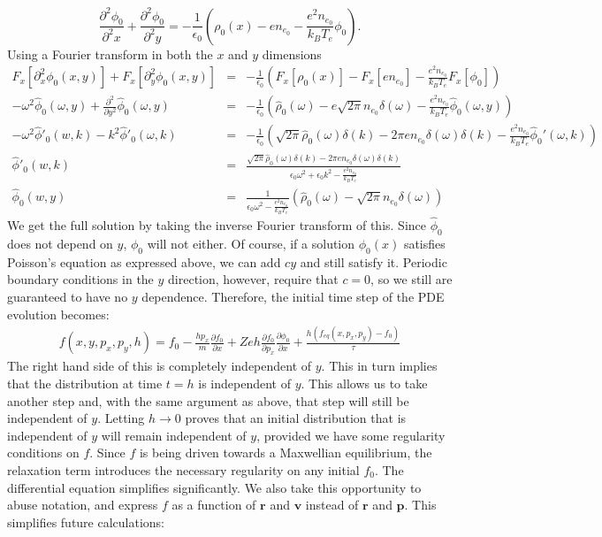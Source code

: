 \documentclass{article}
\begin{document}
\[\frac{\partial^2\phi_0}{\partial^2 x}+\frac{\partial^2\phi_0}{\partial^2 y}=-\frac{1}{\epsilon_0}\left(\rho_0(x)-en_{e_0}-\frac{e^2n_{e_0}}{k_BT_e}\phi_0\right).
\]Using a Fourier transform in both the $x$ and $y$ dimensions
\begin{eqnarray*}
F_x[\partial_x^2\phi_0(x,y)]+F_x[\partial_y^2\phi_0(x,y)]&=&-\frac{1}{\epsilon_0}\left(F_x[\rho_0(x)]-F_x[en_{e_0}]-\frac{e^2n_{e_0}}{k_BT_e}F_x[\phi_0]\right)\\
-\omega^2\hat{\phi}_0(\omega,y)+\frac{\partial^2}{\partial y^2}\hat{\phi}_0(\omega,y)&=&-\frac{1}{\epsilon_0}\left(\hat{\rho}_0(\omega)-e\sqrt{2\pi}n_{e_0}\delta(\omega)-\frac{e^2n_{e_0}}{k_BT_e}\hat{\phi}_0(\omega,y)\right)\\
-\omega^2\hat{\phi}'_0(w,k)-k^2\hat{\phi}'_0(\omega,k)&=&-\frac{1}{\epsilon_0}\left(\sqrt{2\pi}\hat{\rho}_0(\omega)\delta(k)-2\pi e n_{e_0}\delta(\omega)\delta(k)-\frac{e^2n_{e_0}}{k_BT_e}\hat{\phi}_0'(\omega,k)\right)\\
\hat{\phi}'_0(w,k)&=&\frac{\sqrt{2\pi}\hat{\rho}_0(\omega)\delta(k)-2\pi en_{e_0}\delta(\omega)\delta(k)}{\epsilon_0\omega^2+\epsilon_0k^2-\frac{e^2n_{e_0}}{k_BT_e}}\\
\hat{\phi}_0(w,y)&=&\frac{1}{\epsilon_0\omega^2-\frac{e^2n_{e_0}}{k_BT_e}}\left(\hat{\rho}_0(\omega)-\sqrt{2\pi}n_{e_0}\delta(\omega)\right)
\end{eqnarray*}We get the full solution by taking the inverse Fourier transform of this. Since $\hat{\phi}_0$ does not depend on $y$, $\phi_0$ will not either. Of course, if a solution $\phi_0(x)$ satisfies Poisson's equation as expressed above, we can add $cy$ and still satisfy it. Periodic boundary conditions in the $y$ direction, however, require that $c=0$, so we still are guaranteed to have no $y$ dependence. Therefore, the initial time step of the PDE evolution becomes:
\begin{eqnarray*}
f(x,y,p_x,p_y,h)=f_0-\frac{hp_x}{m}\frac{\partial f_0}{\partial x}+Zeh\frac{\partial f_0}{\partial p_x}\frac{\partial \phi_0}{\partial x}+\frac{h(f_{eq}(x,p_x,p_y)-f_0)}{\tau}
\end{eqnarray*}The right hand side of this is completely independent of $y$. This in turn implies that the distribution at time $t=h$ is independent of $y$. This allows us to take another step and, with the same argument as above, that step will still be independent of $y$. Letting $h\to0$ proves that an initial distribution that is independent of $y$ will remain independent of $y$, provided we have some regularity conditions on $f$. Since $f$ is being driven towards a Maxwellian equilibrium, the relaxation term introduces the necessary regularity on any initial $f_0$. The differential equation simplifies significantly. We also take this opportunity to abuse notation, and express $f$ as a function of $\mathbf{r}$ and $\mathbf{v}$ instead of $\mathbf{r}$ and $\mathbf{p}$. This simplifies future calculations:
\end{document}
